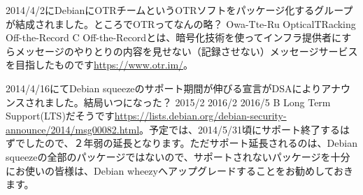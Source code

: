 \santaku
{2014/4/2にDebianにOTRチームというOTRソフトをパッケージ化するグループが結成されました。ところでOTRってなんの略？}
{Owa-Tte-Ru}
{OpticalTRacking}
{Off-the-Record}
{C}
{Off-the-Recordとは、暗号化技術を使ってインフラ提供者にすらメッセージのやりとりの内容を見せない（記録させない）メッセージサービスを目指したものです\url{https://www.otr.im/}。}

\santaku
{2014/4/16にてDebian squeezeのサポート期間が伸びる宣言がDSAによりアナウンスされました。結局いつになった？}
{2015/2}
{2016/2}
{2016/5}
{B}
{Long Term Support(LTS)だそうです\url{https://lists.debian.org/debian-security-announce/2014/msg00082.html}。予定では、2014/5/31頃にサポート終了するはずでしたので、２年弱の延長となります。ただサポート延長されるのは、Debian squeezeの全部のパッケージではないので、サポートされないパッケージを十分にお使いの皆様は、Debian wheezyへアップグレードすることをお勧めしておきます。}


